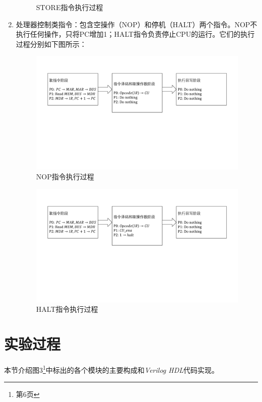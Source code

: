 \documentclass[titlepage, 11pt]{article}
\begin{document}
\begin{enumerate}
\begin{figure}[H]
			\caption{STORE指令执行过程}
		\end{figure}
		\item 处理器控制类指令：包含空操作（NOP）和停机（HALT）两个指令。NOP不执行任何操作，只将PC增加1；HALT指令负责停止CPU的运行。它们的执行过程分别如下图所示：
			\begin{figure}[H]
			\centering
			\includegraphics[scale=0.5]{11.pdf}
			\caption{NOP指令执行过程}
		\end{figure}
		\begin{figure}[H]
			\centering
			\includegraphics[scale=0.5]{12.pdf}
			\caption{HALT指令执行过程}
		\end{figure}
	\end{enumerate}
	\section{实验过程}
	本节介绍图3\footnote{第6页}中标出的各个模块的主要构成和\emph{Verilog HDL}代码实现。
\end{document}
